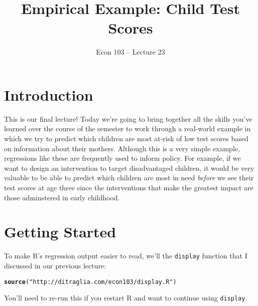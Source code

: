 \documentclass[12pt]{article}\usepackage[]{graphicx}\usepackage[]{color}
\author{Econ 103 -- Lecture 23}
\title{Empirical Example: Child Test Scores}
\date{}
\makeatletter
\newcommand{\hlstr}[1]{\textcolor[rgb]{0.192,0.494,0.8}{#1}}%
\newcommand{\hlstd}[1]{\textcolor[rgb]{0.345,0.345,0.345}{#1}}%
\newcommand{\hlkwd}[1]{\textcolor[rgb]{0.737,0.353,0.396}{\textbf{#1}}}%
\newenvironment{kframe}{%
 \def\at@end@of@kframe{}%
 \ifinner\ifhmode%
  \def\at@end@of@kframe{\end{minipage}}%
  \begin{minipage}{\columnwidth}%
 \fi\fi%
 \def\FrameCommand##1{\hskip\@totalleftmargin \hskip-\fboxsep
 \colorbox{shadecolor}{##1}\hskip-\fboxsep
     \hskip-\linewidth \hskip-\@totalleftmargin \hskip\columnwidth}%
 \MakeFramed {\advance\hsize-\width
   \@totalleftmargin\z@ \linewidth\hsize
   \@setminipage}}%
 {\par\unskip\endMakeFramed%
 \at@end@of@kframe}
\newenvironment{knitrout}{}{} %
\makeatother
\begin{document}
\maketitle

\section*{Introduction}
This is our final lecture!
Today we're going to bring together all the skills you've learned over the course of the semester to work through a real-world example in which we try to predict which children are most at-risk of low test scores based on information about their mothers.
Although this is a very simple example, regressions like these are frequently used to inform policy.
For example, if we want to design an intervention to target disadvantaged children, it would be very valuable to be able to predict which children are most in need \emph{before} we see their test scores at age three since the interventions that make the greatest impact are those adminstered in early childhood.

\section*{Getting Started}
To make R's regression output easier to read, we'll the \texttt{display} function that I discussed in our previous lecture:
\begin{knitrout}
\color{fgcolor}\begin{kframe}
\begin{alltt}
\hlkwd{source}\hlstd{(}\hlstr{"http://ditraglia.com/econ103/display.R"}\hlstd{)}
\end{alltt}
\end{kframe}
\end{knitrout}
You'll need to re-run this if you restart R and want to continue using \texttt{display}.
\end{document}
